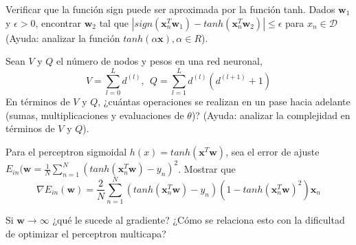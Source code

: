 \documentclass[12pt]{article}
\theoremstyle{definition}
\begin{document}
\begin{pregunta}
Verificar que la función sign puede ser aproximada por la función tanh. Dados $\mathbf{w}_1$ y $\epsilon > 0$, encontrar $\mathbf{w}_2$ tal que $|sign(\mathbf{x}_n^T \mathbf{w}_1) - tanh(\mathbf{x}_n^T \mathbf{w}_2)| \leq \epsilon$ para $x_n \in \mathcal{D}$ (Ayuda: analizar la función $tanh(\alpha \mathbf{x}), \alpha \in R$).\\


\end{pregunta}


\begin{pregunta}
Sean $V$ y $Q$ el número de nodos y pesos en una red neuronal,
\[ V = \sum_{l=0}^L d^{(l)},\ \ Q = \sum_{l=1}^L d^{(l)} (d^{(l+1)}+1)	\]
En términos de $V$ y $Q$, ¿cuántas operaciones se realizan en un pase hacia adelante (sumas, multiplicaciones y evaluaciones de $\theta$)? (Ayuda: analizar la complejidad en términos de $V$ y $Q$).\\


\end{pregunta}


\begin{pregunta}
Para el perceptron sigmoidal $h(x) = tanh(\mathbf{x}^T\mathbf{w})$, sea el error de ajuste $E_{in}(\mathbf{w} = \frac{1}{N} \sum_{n=1}^N (tanh(\mathbf{x}_n^T\mathbf{w}) - y_n)^2$. Mostrar que
\[ \nabla E_{in}(\mathbf{w}) = \frac{2}{N} \sum_{n=1}^N (tanh(\mathbf{x}_n^T \mathbf{w}) -y_n) (1-tanh(\mathbf{x}_n^T \mathbf{w})^2)\mathbf{x}_n	\]

Si $\mathbf{w} \rightarrow \infty$ ¿qué le sucede al gradiente? ¿Cómo se relaciona esto con la dificultad de optimizar el perceptron multicapa?\\


\end{pregunta}
\end{document}
